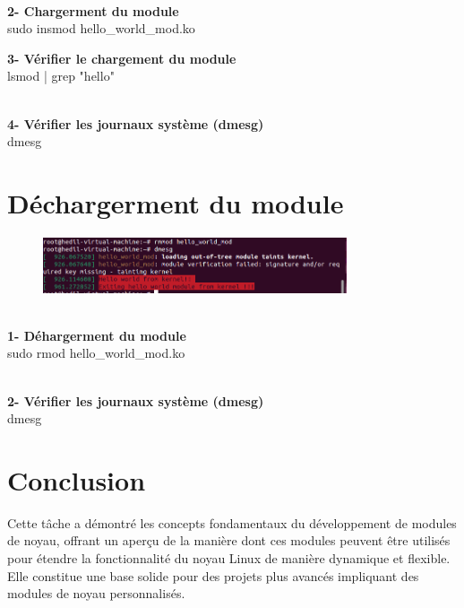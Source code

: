 \\\textbf{2- Chargerment du module}
\\sudo insmod hello\_world\_mod.ko

\textbf{3- Vérifier le chargement du module}
\\lsmod | grep "hello"

\\\textbf{4- Vérifier les journaux système (dmesg) }
\\dmesg

\section{Déchargerment du module}

\begin{figure}[h]
    \includegraphics[width=0.8\textwidth]{images/51.png}   
\end{figure}


\\\textbf{1- Déhargerment du module}
\\sudo rmod hello\_world\_mod.ko


\\\textbf{2- Vérifier les journaux système (dmesg) }
\\dmesg

\section*{Conclusion}
Cette tâche a démontré les concepts fondamentaux du développement de modules de noyau, offrant un aperçu de la manière dont ces modules peuvent être utilisés pour étendre la fonctionnalité du noyau Linux de manière dynamique et flexible. Elle constitue une base solide pour des projets plus avancés impliquant des modules de noyau personnalisés.